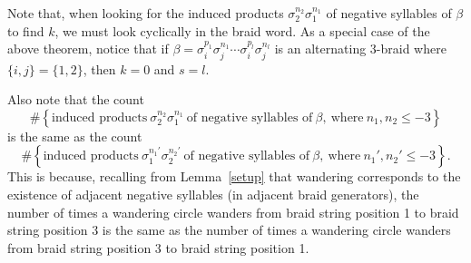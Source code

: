 \documentclass{article}
\begin{document}
Note that, when looking for the induced products $\sigma_{2}^{n_{2}}\sigma_{1}^{n_{1}}$ of negative syllables of $\beta$ to find $k$, we must look cyclically in the braid word. As a special case of the above theorem, notice that if $\beta=\sigma_{i}^{p_{1}}\sigma_{j}^{n_{1}}\cdots\sigma_{i}^{p_{l}}\sigma_{j}^{n_{l}}$ is an alternating 3-braid where $\{i,j\}=\{1,2\}$, then $k=0$ and $s=l$. 

%

Also note that the count $$\# \left\{\text{induced\ products}\ \sigma_{2}^{n_{2}}\sigma_{1}^{n_{1}}\ \text{of\ negative\ syllables\ of}\ \beta,\ \text{where}\ n_{1}, n_{2} \leq -3 \right\}$$ is the same as the count $$\# \left\{\text{induced\ products}\ \sigma_{1}^{n_{1}'}\sigma_{2}^{n_{2}'}\ \text{of\ negative\ syllables\ of}\ \beta,\ \text{where}\ n_{1}', n_{2}' \leq -3 \right\}.$$ This is because, recalling from Lemma~\ref{setup} that wandering corresponds to the existence of adjacent negative syllables (in adjacent braid generators), the number of times a wandering circle wanders from braid string position 1 to braid string position 3 is the same as the number of times a wandering circle wanders from braid string position 3 to braid string position 1.  
\end{document}
